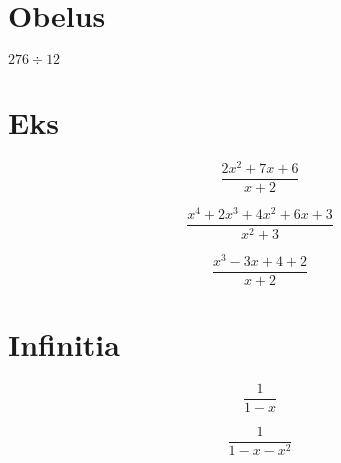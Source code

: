 \documentclass[letterpaper,12pt]{article}
\begin{document}
	\section{Obelus}
		\begin{minipage}{0.5\textwidth}
			\begin{minipage}{0.25\textwidth}
				$276 \div 12$
			\end{minipage}
			\begin{minipage}{0.75\textwidth}
			\end{minipage}
		\end{minipage}
	\section{Eks}
		\begin{center}
			\[\frac{2x^2 + 7x + 6}{x+2}\]

			\hspace{2cm}
		\end{center}
		\begin{center}
			\[\frac{x^4 + 2x^3 + 4x^2 + 6x + 3}{x^2+3}\]

			\hspace{2cm}
		\end{center}
		\begin{center}
			\[\frac{x^3 - 3x + 4 + 2}{x + 2}\]

			\hspace{2cm}
		\end{center}
	\section{Infinitia}
		\begin{center}
			\[\frac{1}{1-x}\]


		\end{center}
		\begin{center}
			\[\frac{1}{1-x-x^2}\]


		\end{center}
\end{document}
